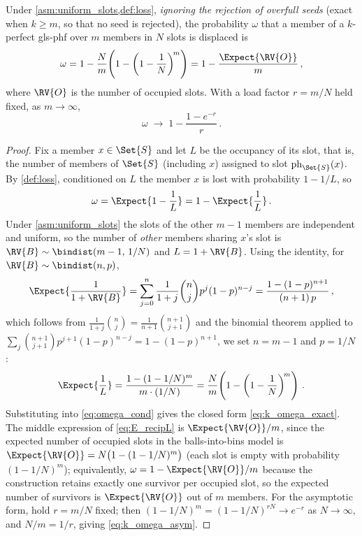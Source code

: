 \documentclass[ ../main.tex]{subfiles}
\begin{document}
\begin{theorem}
\label{thm:k_omega}
Under \cref{asm:uniform_slots,def:loss}, \emph{ignoring the rejection of overfull seeds} (exact when $k \ge m$, so that no seed is rejected), the probability $\omega$ that a member of a $k$-perfect \gls{gls-phf} over $m$ members in $N$ slots is displaced is
\begin{equation}
\label{eq:k_omega_exact}
    \omega
    = 1 - \frac{N}{m}\!\left(1 - \left(1 - \frac{1}{N}\right)^{\!m}\right)
    = 1 - \frac{\Expect{\RV{O}}}{m}\,,
\end{equation}
where $\RV{O}$ is the number of occupied slots. With a load factor $r = m/N$ held fixed, as $m \to \infty$,
\begin{equation}
\label{eq:k_omega_asym}
    \omega \;\longrightarrow\; 1 - \frac{1 - e^{-r}}{r}\,.
\end{equation}
\end{theorem}
\begin{proof}
Fix a member $x \in \Set{S}$ and let $L$ be the occupancy of its slot, that is, the number of members of $\Set{S}$ (including $x$) assigned to slot $\ph_{\Set{S}}(x)$. By \cref{def:loss}, conditioned on $L$ the member $x$ is lost with probability $1 - 1/L$, so
\begin{equation}
\label{eq:omega_cond}
    \omega = \Expect{1 - \frac{1}{L}} = 1 - \Expect{\frac{1}{L}}\,.
\end{equation}
Under \cref{asm:uniform_slots} the slots of the other $m-1$ members are independent and uniform, so the number of \emph{other} members sharing $x$'s slot is $\RV{B} \sim \bindist(m-1,\, 1/N)$ and $L = 1 + \RV{B}$. Using the identity, for $\RV{B} \sim \bindist(n,p)$,
\begin{equation}
\label{eq:binom_recip}
    \Expect{\frac{1}{1+\RV{B}}}
    = \sum_{j=0}^{n} \frac{1}{1+j}\binom{n}{j} p^{j}(1-p)^{n-j}
    = \frac{1 - (1-p)^{n+1}}{(n+1)\,p}\,,
\end{equation}
which follows from $\frac{1}{1+j}\binom{n}{j} = \frac{1}{n+1}\binom{n+1}{j+1}$ and the binomial theorem applied to $\sum_{j} \binom{n+1}{j+1} p^{j+1}(1-p)^{n-j} = 1 - (1-p)^{n+1}$, we set $n = m-1$ and $p = 1/N$:
\begin{equation}
\label{eq:E_recipL}
    \Expect{\frac{1}{L}}
    = \frac{1 - (1 - 1/N)^{m}}{m \cdot (1/N)}
    = \frac{N}{m}\!\left(1 - \left(1 - \frac{1}{N}\right)^{\!m}\right)\,.
\end{equation}
Substituting into \cref{eq:omega_cond} gives the closed form \cref{eq:k_omega_exact}. The middle expression of \cref{eq:E_recipL} is $\Expect{\RV{O}}/m$, since the expected number of occupied slots in the balls-into-bins model is $\Expect{\RV{O}} = N\bigl(1 - (1-1/N)^{m}\bigr)$ (each slot is empty with probability $(1-1/N)^m$); equivalently, $\omega = 1 - \Expect{\RV{O}}/m$ because the construction retains exactly one survivor per occupied slot, so the expected number of survivors is $\Expect{\RV{O}}$ out of $m$ members. For the asymptotic form, hold $r = m/N$ fixed; then $(1-1/N)^{m} = (1 - 1/N)^{rN} \to e^{-r}$ as $N \to \infty$, and $N/m = 1/r$, giving \cref{eq:k_omega_asym}.
\end{proof}
\end{document}
